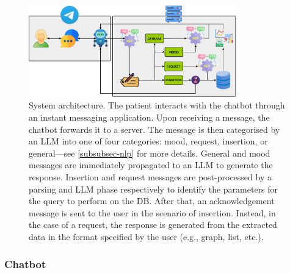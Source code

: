 \begin{figure}[t]
	\centering
	\includegraphics[width=0.8\textwidth]{figures/system_scheme_3llm.pdf}
	\caption{
            System architecture.
            The patient interacts with the chatbot through an instant messaging application.
            Upon receiving a message, the chatbot forwards it to a server. 
            The message is then categorised by an LLM into one of four categories: mood, request, insertion, or general---see \ref{subsubsec-nlp} for more details. 
            General and mood messages are immediately propagated to an LLM to generate the response.
            Insertion and request messages are post-processed by a parsing and LLM phase respectively to identify the parameters for the query to perform on the DB.
            After that, an acknowledgement message is sent to the user in the scenario of insertion.
            Instead, in the case of a request, the response is generated from the extracted data in the format specified by the user (e.g., graph, list, etc.).
        }
	\label{fig:arch}
\end{figure}


\subsubsection{Chatbot}

